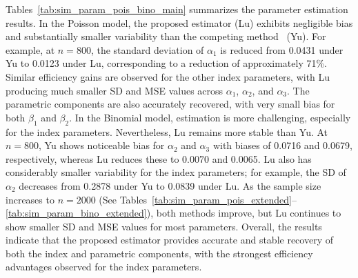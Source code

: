 Tables~\ref{tab:sim_param_pois_bino_main} summarizes the parameter estimation results. In the Poisson model, the proposed estimator (Lu) exhibits negligible bias and substantially smaller variability than the competing method~\cite{Yu2017} (Yu). For example, at $n=800$, the standard deviation of $\alpha_1$ is reduced from 0.0431 under Yu to 0.0123 under Lu, corresponding to a reduction of approximately 71\%. Similar efficiency gains are observed for the other index parameters, with Lu producing much smaller SD and MSE values across $\alpha_1$, $\alpha_2$, and $\alpha_3$. The parametric components are also accurately recovered, with very small bias for both $\beta_1$ and $\beta_2$.
In the Binomial model, estimation is more challenging, especially for the index parameters. Nevertheless, Lu remains more stable than Yu. At $n=800$, Yu shows noticeable bias for $\alpha_2$ and $\alpha_3$ with biases of 0.0716 and 0.0679, respectively, whereas Lu reduces these to 0.0070 and 0.0065. Lu also has considerably smaller variability for the index parameters; for example, the SD of $\alpha_2$ decreases from 0.2878 under Yu to 0.0839 under Lu. As the sample size increases to $n=2000$ (See Tables~\ref{tab:sim_param_pois_extended}--\ref{tab:sim_param_bino_extended}), both methods improve, but Lu continues to show smaller SD and MSE values for most parameters. Overall, the results indicate that the proposed estimator provides accurate and stable recovery of both the index and parametric components, with the strongest efficiency advantages observed for the index parameters.


